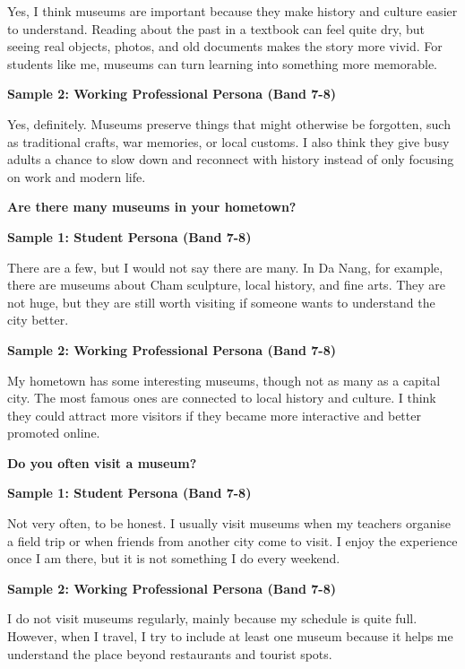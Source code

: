 Yes, I think museums are important because they make history and culture easier to understand. Reading about the past in a textbook can feel quite dry, but seeing real objects, photos, and old documents makes the story more vivid. For students like me, museums can turn learning into something more memorable.

\textbf{Sample 2: Working Professional Persona (Band 7-8)}

Yes, definitely. Museums preserve things that might otherwise be forgotten, such as traditional crafts, war memories, or local customs. I also think they give busy adults a chance to slow down and reconnect with history instead of only focusing on work and modern life.

\separator

\begin{ieltsquestion}
\textbf{Are there many museums in your hometown?}
\end{ieltsquestion}
\textbf{Sample 1: Student Persona (Band 7-8)}

There are a few, but I would not say there are many. In Da Nang, for example, there are museums about Cham sculpture, local history, and fine arts. They are not huge, but they are still worth visiting if someone wants to understand the city better.

\textbf{Sample 2: Working Professional Persona (Band 7-8)}

My hometown has some interesting museums, though not as many as a capital city. The most famous ones are connected to local history and culture. I think they could attract more visitors if they became more interactive and better promoted online.

\separator

\begin{ieltsquestion}
\textbf{Do you often visit a museum?}
\end{ieltsquestion}
\textbf{Sample 1: Student Persona (Band 7-8)}

Not very often, to be honest. I usually visit museums when my teachers organise a field trip or when friends from another city come to visit. I enjoy the experience once I am there, but it is not something I do every weekend.

\textbf{Sample 2: Working Professional Persona (Band 7-8)}

I do not visit museums regularly, mainly because my schedule is quite full. However, when I travel, I try to include at least one museum because it helps me understand the place beyond restaurants and tourist spots.

